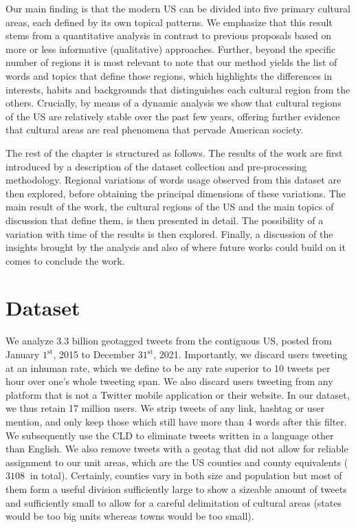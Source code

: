 \documentclass[../thesis.tex]{subfiles}
\begin{document}
Our main finding is that the modern US can be divided into five primary cultural areas,
each defined by its own topical patterns. We emphasize that this result stems from a
quantitative analysis in contrast to previous proposals based on more or less
informative (qualitative) approaches. Further, beyond the specific number of regions it
is most relevant to note that our method yields the list of words and topics that define
those regions, which highlights the differences in interests, habits and backgrounds
that distinguishes each cultural region from the others. Crucially, by means of a
dynamic analysis we show that cultural regions of the US are relatively stable over the
past few years, offering further evidence that cultural areas are real phenomena that
pervade American society.


The rest of the chapter is structured as follows.
The results of the work are first
introduced by a description of the dataset collection and pre-processing methodology.
Regional variations of words usage observed from this dataset are then explored, before
obtaining the principal dimensions of these variations. The main result of the work, the
cultural regions of the US and the main topics of discussion that define them, is then
presented in detail. The possibility of a variation with time of the results is then
explored. Finally, a discussion of the insights brought by the analysis and also of
where future works could build on it comes to conclude the work.



\section{Dataset}

We analyze 3.3 billion geotagged tweets from the contiguous US, posted from January
$1^\text{st}$, 2015 to December $31^\text{st}$, 2021. Importantly, we discard users
tweeting at an inhuman rate, which we define to be any rate superior to 10 tweets per
hour over one's whole tweeting span. We also discard users tweeting from any platform
that is not a Twitter mobile application or their website. In our dataset, we thus
retain 17 million users. We strip tweets of any link, hashtag or user mention, and only
keep those which still have more than 4 words after this filter. We subsequently use the
\ac{CLD} to eliminate tweets written in a language other than English. We also remove
tweets with a geotag that did not allow for reliable assignment to our unit areas, which
are the US counties and county equivalents ($\SI{3108}{}$ in total). Certainly, counties
vary in both size and population but most of them form a useful division sufficiently
large to show a sizeable amount of tweets and sufficiently small to allow for a careful
delimitation of cultural areas (states would be too big units whereas towns would be too
small).
\end{document}
